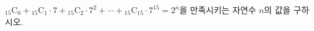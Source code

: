 ${}_{15}\mathrm{C}_0+{}_{15}\mathrm{C}_1\cdot 7+{}_{15}\mathrm{C}_2\cdot 7^2+\cdots+{}_{15}\mathrm{C}_{15}\cdot 7^{15}=2^n$을 만족시키는 자연수 $n$의 값을 구하시오.
